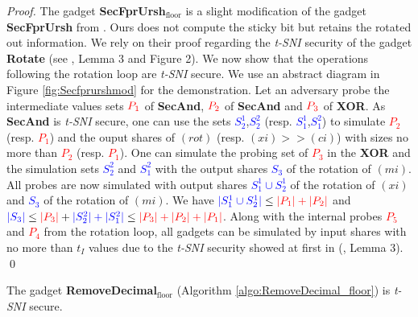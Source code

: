 \documentclass[runningheads]{llncs}
\begin{document}
\begin{proof}
  The gadget \textbf{SecFprUrsh$_\text{floor}$} is a slight modification of the gadget \textbf{SecFprUrsh} from \cite{Chen_Chen_2024}. Ours does not compute the sticky bit but retains the rotated out information. We rely on their proof regarding the \emph{t-SNI} security of the gadget \textbf{Rotate} (see \cite{Chen_Chen_2024}, Lemma 3 and Figure 2). We now show that the operations following the rotation loop are \emph{t-SNI} secure. We use an abstract diagram in Figure \ref{fig:Secfprurshmod} for the demonstration. Let an adversary probe the intermediate values sets $\textcolor{red}{P_1}$ of \textbf{SecAnd}, $\textcolor{red}{P_2}$ of \textbf{SecAnd} and $\textcolor{red}{P_3}$ of \textbf{XOR}. As \textbf{SecAnd} is \emph{t-SNI} secure, one can use the sets \textcolor{blue}{$S_2^1$},\textcolor{blue}{$S_2^2$} (resp. \textcolor{blue}{$S_1^1$},\textcolor{blue}{$S_1^2$}) to simulate \textcolor{red}{$P_2$} (resp. \textcolor{red}{$P_1$}) and the ouput shares of $(rot)$ (resp. $(xi)>>(ci)$) with sizes no more than \textcolor{red}{$P_2$} (resp. \textcolor{red}{$P_1$}). One can simulate the probing set of \textcolor{red}{$P_3$} in the \textbf{XOR} and the simulation sets \textcolor{blue}{$S_2^2$} and \textcolor{blue}{$S_1^2$} with the output shares \textcolor{blue}{$S_3$} of the rotation of $(mi)$. All probes are now simulated with output shares \textcolor{blue}{$S_1^1\cup S_2^1$} of the rotation of $(xi)$ and \textcolor{blue}{$S_3$} of the rotation of $(mi)$. We have $\textcolor{blue}{|S_1^1\cup S_2^1|} \leq \textcolor{red}{|P_1| + |P_2|}$ and $\textcolor{blue}{|S_3|}\leq \textcolor{red}{|P_3|}+\textcolor{blue}{|S_2^2| + |S_1^2|} \leq \textcolor{red}{|P_3|+|P_2|+|P_1|}$. Along with the internal probes \textcolor{red}{$P_5$} and \textcolor{red}{$P_4$} from the rotation loop, all gadgets can be simulated by input shares with no more than $t_I$ values due to the \emph{t-SNI} security showed at first in (\cite{Chen_Chen_2024}, Lemma 3). \hfill \qed
\end{proof}


\begin{lemma}\label{lemma:remdec}
  The gadget \textbf{RemoveDecimal$_\text{floor}$} (Algorithm \ref{algo:RemoveDecimal_floor}) is \emph{t-SNI} secure.
\end{lemma}
\end{document}

